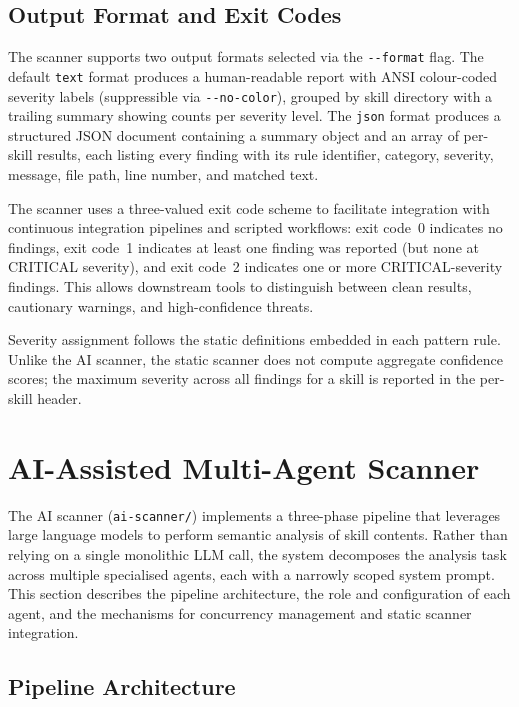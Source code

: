 \subsection{Output Format and Exit Codes}

The scanner supports two output formats selected via the \texttt{-{}-format} flag. The default \texttt{text} format produces a human-readable report with ANSI colour-coded severity labels (suppressible via \texttt{-{}-no-color}), grouped by skill directory with a trailing summary showing counts per severity level. The \texttt{json} format produces a structured JSON document containing a summary object and an array of per-skill results, each listing every finding with its rule identifier, category, severity, message, file path, line number, and matched text.

The scanner uses a three-valued exit code scheme to facilitate integration with continuous integration pipelines and scripted workflows: exit code~0 indicates no findings, exit code~1 indicates at least one finding was reported (but none at CRITICAL severity), and exit code~2 indicates one or more CRITICAL-severity findings. This allows downstream tools to distinguish between clean results, cautionary warnings, and high-confidence threats.

Severity assignment follows the static definitions embedded in each pattern rule. Unlike the AI scanner, the static scanner does not compute aggregate confidence scores; the maximum severity across all findings for a skill is reported in the per-skill header.

\section{AI-Assisted Multi-Agent Scanner}
\label{sec:ai}

The AI scanner (\texttt{ai-scanner/}) implements a three-phase pipeline that leverages large language models to perform semantic analysis of skill contents. Rather than relying on a single monolithic LLM call, the system decomposes the analysis task across multiple specialised agents, each with a narrowly scoped system prompt. This section describes the pipeline architecture, the role and configuration of each agent, and the mechanisms for concurrency management and static scanner integration.

\subsection{Pipeline Architecture}

